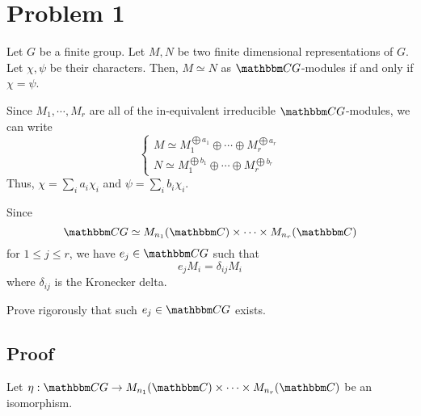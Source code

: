 \section*{Problem 1}

\begin{theorem}
  Let \(G\) be a finite group.
  Let \(M, N\) be two finite dimensional representations of \(G\).
  Let \(\chi, \psi\) be their characters.
  Then, \(M \simeq N\) as \(\bbC G\)-modules if and only if \(\chi = \psi\).
\end{theorem}

Since \(M_1, \cdots, M_r\) are all of the in-equivalent irreducible
\(\bbC G\)-modules, we can write
\[\left\{\begin{array}{c}
  M \simeq M_1^{\bigoplus a_1} \oplus \cdots \oplus M_r^{\bigoplus a_r} \\
  N \simeq M_1^{\bigoplus b_1} \oplus \cdots \oplus M_r^{\bigoplus b_r}
\end{array}\right.\]
Thus, \(\chi = \sum_i a_i \chi_i\) and \(\psi = \sum_i b_i \chi_i\).

Since
\[\bbC G \simeq M_{n_1}(\bbC) \times \cdots \times M_{n_r}(\bbC)\]
for \(1 \le j \le r\),
we have \(e_j \in \bbC G\) such that
\[e_j M_i = \delta_{ij} M_i\]
where \(\delta_{ij}\) is the Kronecker delta.

Prove rigorously that such \(e_j \in \bbC G\) exists.

\subsection*{Proof}

Let \(\eta: \bbC G \to M_{n_1}(\bbC) \times \cdots \times M_{n_r}(\bbC)\)
be an isomorphism.

